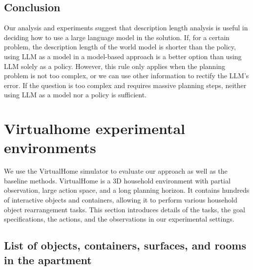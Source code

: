 \subsection{Conclusion}

Our analysis and experiments suggest that description length analysis is useful in deciding how to use a large language model in the solution. If, for a certain problem, the description length of the world model is shorter than the policy, using LLM as a model in a model-based approach is a better option than using LLM solely as a policy. However, this rule only applies when the planning problem is not too complex, or we can use other information to rectify the LLM's error. If the question is too complex and requires massive planning steps, neither using LLM as a model nor a policy is sufficient. 
\fi


\section{Virtualhome experimental environments}

We use the VirtualHome simulator \cite{puig2018virtualhome} to evaluate our approach as well as the baseline methods. VirtualHome is a 3D household environment with partial observation, large action space, and a long planning horizon. It contains hundreds of interactive objects and containers, allowing it to perform various household object rearrangement tasks. This section introduces details of the tasks, the goal specifications, the actions, and the observations in our experimental settings. 

\subsection{List of objects, containers, surfaces, and rooms in the apartment}

